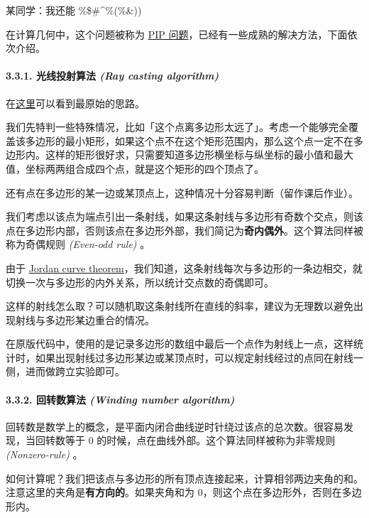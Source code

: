 \begin{QUOTE}{}{}
某同学：我还能 \%\$\#\textasciicircum{}\%(\%\&))
\end{QUOTE}

在计算几何中，这个问题被称为 \href{https://en.wikipedia.org/wiki/Point_in_polygon}{PIP 问题}，已经有一些成熟的解决方法，下面依次介绍。

\paragraph{3.3.1. 光线投射算法 {\em (Ray casting algorithm) }}

在\href{https://wrf.ecse.rpi.edu//Research/Short_Notes/pnpoly.html}{这里}可以看到最原始的思路。

我们先特判一些特殊情况，比如「这个点离多边形太远了」。考虑一个能够完全覆盖该多边形的最小矩形，如果这个点不在这个矩形范围内，那么这个点一定不在多边形内。这样的矩形很好求，只需要知道多边形横坐标与纵坐标的最小值和最大值，坐标两两组合成四个点，就是这个矩形的四个顶点了。

还有点在多边形的某一边或某顶点上，这种情况十分容易判断（留作课后作业）。

我们考虑以该点为端点引出一条射线，如果这条射线与多边形有奇数个交点，则该点在多边形内部，否则该点在多边形外部，我们简记为\textbf{奇内偶外}。这个算法同样被称为奇偶规则 {\em (Even-odd rule) }。

由于 \href{https://en.wikipedia.org/wiki/Jordan_curve_theorem}{Jordan curve theorem}，我们知道，这条射线每次与多边形的一条边相交，就切换一次与多边形的内外关系，所以统计交点数的奇偶即可。

这样的射线怎么取？可以随机取这条射线所在直线的斜率，建议为无理数以避免出现射线与多边形某边重合的情况。

在原版代码中，使用的是记录多边形的数组中最后一个点作为射线上一点，这样统计时，如果出现射线过多边形某边或某顶点时，可以规定射线经过的点同在射线一侧，进而做跨立实验即可。

\paragraph{3.3.2. 回转数算法 {\em (Winding number algorithm) }}

回转数是数学上的概念，是平面内闭合曲线逆时针绕过该点的总次数。很容易发现，当回转数等于 $0$ 的时候，点在曲线外部。这个算法同样被称为非零规则 {\em (Nonzero-rule) }。

如何计算呢？我们把该点与多边形的所有顶点连接起来，计算相邻两边夹角的和。注意这里的夹角是\textbf{有方向的}。如果夹角和为 $0$，则这个点在多边形外，否则在多边形内。


